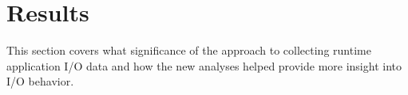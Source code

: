 \section{Results}
This section covers what significance of the approach to collecting runtime application I/O data and how the new analyses helped provide more insight into I/O behavior.
